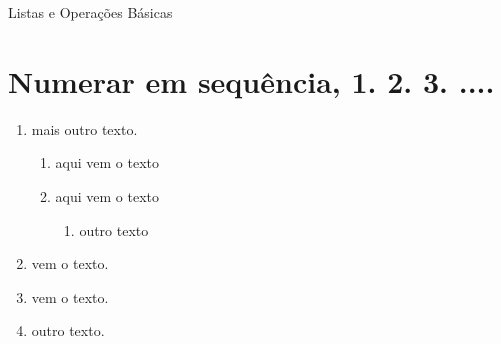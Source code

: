 \documentclass[a4paper, 12pt]{article}
\begin{document}
Listas e Operações Básicas
\section{Numerar em sequência, 1. 2. 3. ....}
    \begin{enumerate}
        itens
        \item mais outro texto.
        \begin{enumerate}
            subitens
            \item{aqui vem o texto}
            \item{aqui vem o texto}
                \begin{enumerate}
                    \item{outro texto}
                \end{enumerate}
        \end{enumerate}
        \item vem o texto.
        \item vem o texto.
        \item outro texto.
    \end{enumerate}
\end{document}
